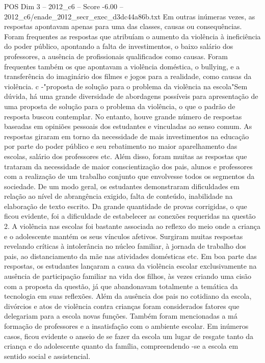 \begin{textsample}{POS Dim 3 – 2012\_c6 – Score -6.00 – 2012\_c6/enade\_2012\_secr\_exec\_d3dc44a86b.txt}
Em outras inúmeras vezes, as respostas apontavam apenas para uma das classes, causas ou consequências.
Foram frequentes as respostas que atribuíam o aumento da violência à ineficiência do poder público, apontando a falta de investimentos, o baixo salário dos professores, a ausência de profissionais qualificados como causas.
Foram frequentes também os que apontavam a violência doméstica, o bullying, e a transferência do imaginário dos filmes e jogos para a realidade, como causas da violência. c -"proposta de solução para o problema da violência na escola"Sem dúvida, há uma grande diversidade de abordagens possíveis para apresentação de uma proposta de solução para o problema da violência, o que o padrão de resposta buscou contemplar.
No entanto, houve grande número de respostas baseadas em opiniões pessoais dos estudantes e vinculadas ao senso comum.
As respostas giraram em torno da necessidade de mais investimentos na educação por parte do poder público e seu rebatimento no maior aparelhamento das escolas, salário dos professores etc.
Além disso, foram muitas as respostas que trataram da necessidade de maior conscientização dos pais, alunos e professores com a realização de um trabalho conjunto que envolvesse todos os segmentos da sociedade.
De um modo geral, os estudantes demonstraram dificuldades em relação ao nível de abrangência exigido, falta de conteúdo, inabilidade na elaboração de texto escrito.
Da grande quantidade de provas corrigidas, o que ficou evidente, foi a dificuldade de estabelecer as conexões requeridas na questão 2.
A violência nas escolas foi bastante associada ao reflexo do meio onde a criança e o adolescente mantém os seus vínculos afetivos.
Surgiram muitas respostas revelando críticas à intolerância no núcleo familiar, à jornada de trabalho dos pais, ao distanciamento da mãe nas atividades domésticas etc.
Em boa parte das respostas, os estudantes lançaram a causa da violência escolar exclusivamente na ausência de participação familiar na vida dos filhos, às vezes criando uma cisão com a proposta da questão, já que abandonavam totalmente a temática da tecnologia em suas reflexões.
Além da ausência dos pais no cotidiano da escola, divórcios e atos de violência contra crianças foram considerados fatores que delegariam para a escola novas funções.
Também foram mencionadas a má formação de professores e a insatisfação com o ambiente escolar.
Em inúmeros casos, ficou evidente o anseio de se fazer da escola um lugar de resgate tanto da criança e do adolescente quanto da família, compreendendo -se a escola em sentido social e assistencial.

\end{textsample}

